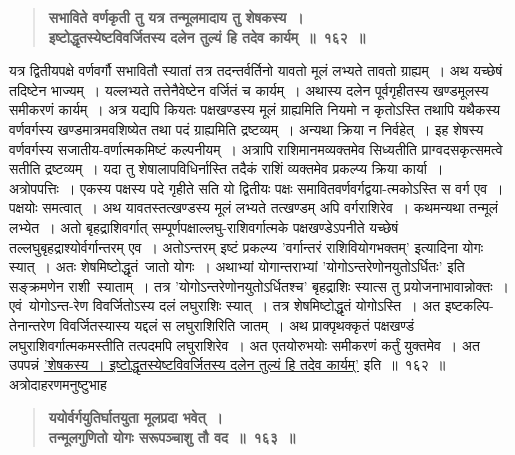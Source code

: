 \documentclass[11pt, openany]{book}
\begin{document}
\newpage

\begin{sloppypar}

 \label{10.162}
\begin{quote}
{\large \textbf{{\color{purple}सभाविते वर्णकृती तु यत्र तन्मूलमादाय तु शेषकस्य~।\\
इष्टोद्धृतस्येष्टविवर्जितस्य दलेन तुल्यं हि तदेव कार्यम्~॥~१६२~॥}}}
\end{quote}

यत्र द्वितीयपक्षे वर्णवर्गौ सभावितौ स्यातां तत्र तदन्तर्वर्तिनो यावतो मूलं लभ्यते तावतो ग्राह्यम्~। अथ यच्छेषं तदिष्टेन भाज्यम्~। यल्लभ्यते तत्तेनैवेष्टेन वर्जितं च कार्यम्~। अथास्य दलेन पूर्वगृहीतस्य खण्डमूलस्य समीकरणं कार्यम्~। अत्र यद्यपि कियतः पक्षखण्डस्य मूलं ग्राह्यमिति नियमो न कृतोऽस्ति तथापि यथैकस्य वर्णवर्गस्य खण्डमात्रमवशिष्येत तथा पदं ग्राह्यमिति द्रष्टव्यम्~। अन्यथा क्रिया न निर्वहेत्~। इह शेषस्य वर्णवर्गस्य सजातीय-वर्णात्मकमिष्टं कल्पनीयम्~। अत्रापि राशिमानमव्यक्तमेव सिध्यतीति प्राग्वदसकृत्समत्वे सतीति द्रष्टव्यम्~। यदा तु शेषालापविधिर्नास्ति तदैकं राशिं व्यक्तमेव प्रकल्प्य क्रिया कार्या~।\\

अत्रोपपत्तिः~। एकस्य पक्षस्य पदे गृहीते सति यो द्वितीयः पक्षः समावितवर्णवर्गद्वया-त्मकोऽस्ति स वर्ग एव~। पक्षयोः समत्वात्~। अथ यावतस्तत्खण्डस्य मूलं लभ्यते तत्खण्डम् अपि वर्गराशिरेव~। कथमन्यथा तन्मूलं लभ्येत~। अतो बृहद्राशिवर्गात् सम्पूर्णपक्षाल्लघु-राशिवर्गात्मके पक्षखण्डेऽपनीते यच्छेषं तल्लघुबृहद्राश्योर्वर्गान्तरम् एव~। अतोऽन्तरम् इष्टं प्रकल्प्य {\color{violet}'वर्गान्तरं राशिवियोगभक्तम्'} इत्यादिना योगः स्यात्~। अतः शेषमिष्टोद्धृतं~जातो योगः~। अथाभ्यां योगान्तराभ्यां {\color{violet}'योगोऽन्तरेणोनयुतोऽर्धितः'} इति सङ्क्रमणेन राशी~स्याताम्~। तत्र {\color{violet}'योगोऽन्तरेणोनयुतोऽर्धितश्च'} बृहद्राशिः स्यात्स तु प्रयोजनाभावान्नोक्तः~। एवं~योगोऽन्त-रेण विवर्जितोऽस्य दलं लघुराशिः स्यात्~। तत्र शेषमिष्टोद्धृतं योगोऽस्ति~। अत इष्टकल्पि-तेनान्तरेण विवर्जितस्यास्य यद्दलं स लघुराशिरिति जातम्~। अथ प्राक्पृथक्कृतं पक्षखण्डं लघुराशिवर्गात्मकमस्तीति तत्पदमपि लघुराशिरेव~। अत एतयोरुभयोः समीकरणं कर्तुं युक्तमेव~। अत उपपन्नं \hyperref[10.162]{'शेषकस्य~। इष्टोद्धृतस्येष्टविवर्जितस्य दलेन तुल्यं हि तदेव कार्यम्'} इति~॥~१६२~॥\\

{\small अत्रोदाहरणमनुष्टुभाह\textendash }

 \label{10.163}
\begin{quote}
{\large \textbf{{\color{purple}ययोर्वर्गयुतिर्घातयुता मूलप्रदा भवेत्~।\\
तन्मूलगुणितो योगः सरूपञ्चाशु तौ वद~॥~१६३~॥}}}
\end{quote}


\end{sloppypar}
\end{document}
